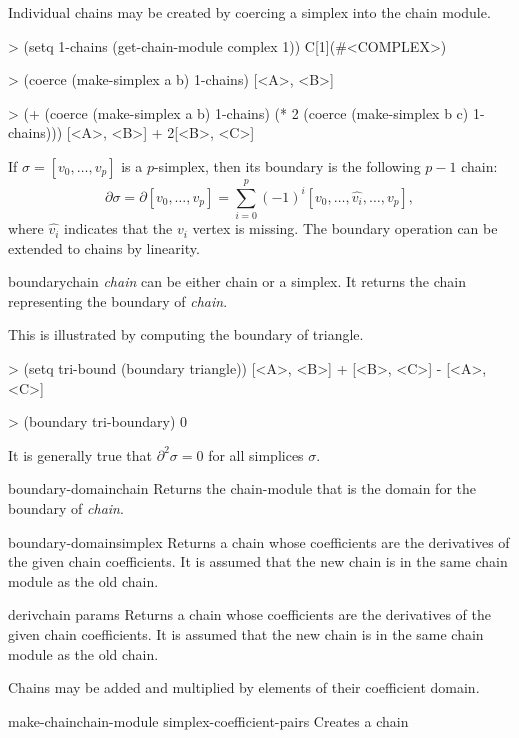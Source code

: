 Individual chains may be created by coercing a simplex into the chain
module.
\begin{code}
> (setq 1-chains (get-chain-module complex 1))
C[1](#<COMPLEX>)

> (coerce (make-simplex a b) 1-chains)
[<A>, <B>]

> (+ (coerce (make-simplex a b) 1-chains) 
     (* 2 (coerce (make-simplex b c) 1-chains)))
[<A>, <B>] + 2[<B>, <C>]
\end{code}

If $\sigma = [v_0, \ldots, v_p]$ is a $p$-simplex, then its boundary
is the following $p-1$ chain:
\[
\partial \sigma = \partial [v_0, \ldots, v_p]
 = \sum_{i=0}^p (-1)^i [v_0, \ldots, \hat{v_i}, \ldots, v_p],
\]
where $\hat{v_i}$ indicates that the $v_i$ vertex is missing.
The boundary operation can be extended to chains by linearity.

\begin{functiondef}{boundary}{chain}
{\em chain} can be either chain or a simplex.  It returns the chain
representing the boundary of {\em chain\/}.
\end{functiondef}

This is illustrated by computing the boundary of {\sf triangle}.
\begin{code}
> (setq tri-bound (boundary triangle))
[<A>, <B>] + [<B>, <C>] - [<A>, <C>]

> (boundary tri-boundary)
0
\end{code}
It is generally true that $\partial^2 \sigma = 0$ for all simplices
$\sigma$. 

\begin{functiondef}{boundary-domain}{chain}
Returns the chain-module that is the domain for the boundary of {\em
chain}. 
\end{functiondef}
  
\begin{functiondef}{boundary-domain}{simplex}
Returns a chain whose coefficients are the derivatives of the given
chain coefficients.  It is assumed that the new chain is in the same
chain module as the old chain.
\end{functiondef}

 
\begin{functiondef}{deriv}{chain \rest params}
Returns a chain whose coefficients are the derivatives of the given
chain coefficients.  It is assumed that the new chain is in the same
chain module as the old chain.
\end{functiondef}
  
Chains may be added and multiplied by elements of their coefficient domain.  
  
\begin{functiondef}{make-chain}{chain-module simplex-coefficient-pairs}
Creates a chain
\end{functiondef}


